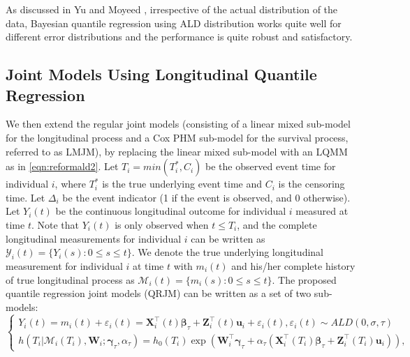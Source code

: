 \documentclass[Crown, sagev, times, doublespace]{sagej}
\begin{document}
As discussed in Yu and Moyeed \cite{yu2001bayesian}, irrespective of the actual distribution of the data, Bayesian quantile regression using ALD distribution works quite well for different error distributions and the performance is quite robust and satisfactory.

\subsection{Joint Models Using Longitudinal Quantile Regression} %
We then extend the regular joint models (consisting of a linear mixed sub-model for the longitudinal process and a Cox PHM sub-model for the survival process, referred to as LMJM), by replacing the linear mixed sub-model with an LQMM as in \eqref{eqn:reformald2}. Let $T_i=min(T_i^*, C_i)$ be the observed event time for individual $i$, where $T_i^*$ is the true underlying event time and $C_i$ is the censoring time. Let $\Delta_i$ be the event indicator (1 if the event is observed, and 0 otherwise). Let $Y_{i}(t)$ be the continuous longitudinal outcome for individual $i$ measured at time $t$. Note that $Y_{i}(t)$ is only observed when $t\le T_i$, and the complete longitudinal measurements for individual $i$ can be written as $\mathcal{Y}_{i}(t)=\{Y_{i}(s): 0\le s\le t\}$. We denote the true underlying longitudinal measurement for individual $i$ at time $t$ with $m_{i}(t)$ and his/her complete history of true longitudinal process as $\mathcal{M}_{i}(t)=\{m_{i}(s): 0\le s \le t\}$. The proposed quantile regression joint models (QRJM) can be written as a set of two sub-models:
\begin{equation}\label{eqn:joint}
\left\{
\begin{array}{l}
Y_{i}(t) = m_{i}(t) + \varepsilon_{i}(t) = {\boldsymbol X}_{i}^{\top}(t)\boldsymbol{\beta}_{\tau} + {\boldsymbol Z}_{i}^{\top}(t){\boldsymbol u}_i + \varepsilon_{i}(t), \varepsilon_{i}(t)\sim ALD(0, \sigma, \tau)\\
h(T_i|\mathcal{M}_{i}(T_i), {\boldsymbol W}_i;  \boldsymbol{\gamma}_{\tau}, \alpha_{\tau}) = h_0(T_i)\exp({\boldsymbol W}_i^{\top}\boldsymbol{\gamma}_{\tau} + \alpha_{\tau}({\boldsymbol X}^{\top}_{i}(T_i)\boldsymbol{\beta}_{\tau} + {\boldsymbol Z}^{\top}_{i}(T_i){\boldsymbol u}_{i})),
\end{array}
\right.
\end{equation}
\end{document}
